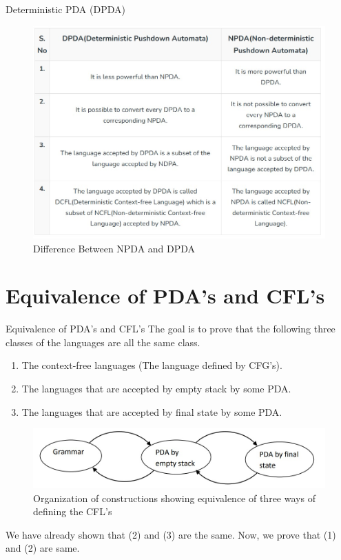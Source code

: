\documentclass{beamer}
\begin{document}
\begin{frame}{Deterministic PDA (DPDA)}
	\begin{figure}
		\includegraphics[scale=.5]{img4/m9}
		\caption{Difference Between NPDA and DPDA}
	\end{figure}
\end{frame}
\section{Equivalence of PDA's and CFL's }
\begin{frame}{Equivalence of PDA's and CFL's }
	The goal is to prove that the following three classes of the languages are all the same
	class.
	\begin{enumerate}
		\item The context-free languages (The language defined by CFG’s).
		\item The languages that are accepted by empty stack by some PDA.
	\item The languages that are accepted by final state by some PDA.

	\end{enumerate}
		\begin{figure}
		\includegraphics[scale=.5]{img4/m6}
		\caption{Organization of constructions showing equivalence of three ways of defining the CFL’s}
	\end{figure}
We have already shown that (2) and (3) are the same. Now, we prove that (1) and
(2) are same.

\end{frame}
\end{document}
